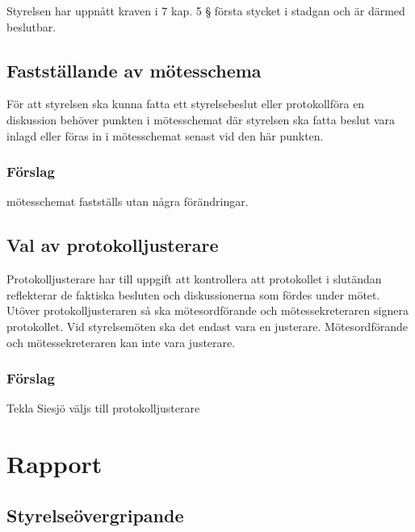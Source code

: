 \documentclass[protokoll]{dvd}
\begin{document}
\begin{attsatser}
    \item Styrelsen har uppnått kraven i 7 kap. 5 § första stycket i stadgan och är därmed beslutbar.
\end{attsatser}

\subsection{Fastställande av mötesschema}

För att styrelsen ska kunna fatta ett styrelsebeslut eller protokollföra en diskussion behöver punkten i mötesschemat där styrelsen ska fatta beslut vara inlagd eller föras in i mötesschemat senast vid den här punkten.

\subsubsection*{Förslag}

\begin{attsatser}
    \item mötesschemat fastställs utan några förändringar.
\end{attsatser}

\subsection{Val av protokolljusterare}

Protokolljusterare har till uppgift att kontrollera att protokollet i slutändan reflekterar de faktiska besluten och diskussionerna som fördes under mötet.
Utöver protokolljusteraren så ska mötesordförande och mötessekreteraren signera protokollet.
Vid styrelsemöten ska det endast vara en justerare.
Mötesordförande och mötessekreteraren kan inte vara justerare.

\subsubsection*{Förslag}
\begin{attsatser}
    \item Tekla Siesjö väljs till protokolljusterare
\end{attsatser}

\section{Rapport}

\subsection{Styrelseövergripande}
\end{document}
